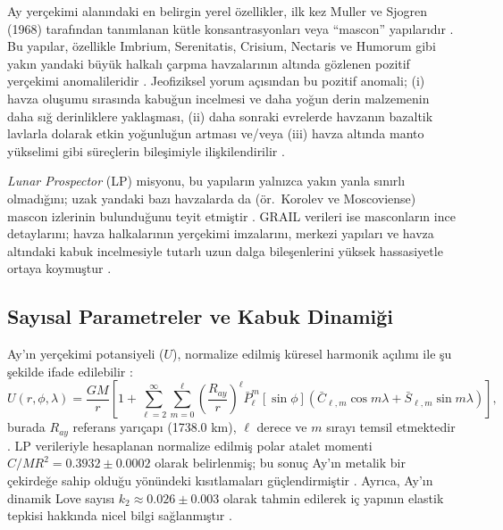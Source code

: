 Ay yerçekimi alanındaki en belirgin yerel özellikler, ilk kez Muller ve Sjogren (1968) tarafından tanımlanan kütle konsantrasyonları veya ``mascon'' yapılarıdır \cite{Muller1968,Zuber2013}. Bu yapılar, özellikle Imbrium, Serenitatis, Crisium, Nectaris ve Humorum gibi yakın yandaki büyük halkalı çarpma havzalarının altında gözlenen pozitif yerçekimi anomalileridir \cite{Muller1968}. Jeofiziksel yorum açısından bu pozitif anomali; (i) havza oluşumu sırasında kabuğun incelmesi ve daha yoğun derin malzemenin daha sığ derinliklere yaklaşması, (ii) daha sonraki evrelerde havzanın bazaltik lavlarla dolarak etkin yoğunluğun artması ve/veya (iii) havza altında manto yükselimi gibi süreçlerin bileşimiyle ilişkilendirilir \cite{Zuber2013}.

\textit{Lunar Prospector} (LP) misyonu, bu yapıların yalnızca yakın yanla sınırlı olmadığını; uzak yandaki bazı havzalarda da (ör.\ Korolev ve Moscoviense) mascon izlerinin bulunduğunu teyit etmiştir \cite{Konopliv2001}. GRAIL verileri ise masconların ince detaylarını; havza halkalarının yerçekimi imzalarını, merkezi yapıları ve havza altındaki kabuk incelmesiyle tutarlı uzun dalga bileşenlerini yüksek hassasiyetle ortaya koymuştur \cite{Zuber2013}.

\subsection{Sayısal Parametreler ve Kabuk Dinamiği}

Ay'ın yerçekimi potansiyeli ($U$), normalize edilmiş küresel harmonik açılımı ile şu şekilde ifade edilebilir \cite{Konopliv2001}:
\begin{equation}
U(r,\phi,\lambda) =
\frac{GM}{r}
\left[
1 + \sum_{\ell=2}^{\infty}\sum_{m=0}^{\ell}
\left(\frac{R_{ay}}{r}\right)^{\ell}
\bar{P}_{\ell}^m[\sin\phi]
\left(
\bar{C}_{\ell,m}\cos m\lambda + \bar{S}_{\ell,m}\sin m\lambda
\right)
\right],
\end{equation}
burada $R_{ay}$ referans yarıçapı (1738.0 km), $\ell$ derece ve $m$ sırayı temsil etmektedir \cite{Konopliv2001}. LP verileriyle hesaplanan normalize edilmiş polar atalet momenti $C/MR^2 = 0.3932 \pm 0.0002$ olarak belirlenmiş; bu sonuç Ay'ın metalik bir çekirdeğe sahip olduğu yönündeki kısıtlamaları güçlendirmiştir \cite{Konopliv2001}. Ayrıca, Ay'ın dinamik Love sayısı $k_2 \approx 0.026 \pm 0.003$ olarak tahmin edilerek iç yapının elastik tepkisi hakkında nicel bilgi sağlanmıştır \cite{Konopliv2001}.




